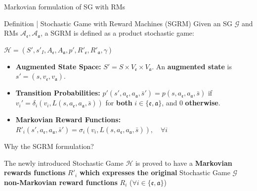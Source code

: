 \documentclass[10pt, aspectratio=169]{beamer}
\newcommand{\evidenzia}[1]{\textcolor{verdeSalvia}{\textbf{#1}}}
\begin{document}
\begin{frame}{Markovian formulation of SG with RMs}

    \begin{block}{Definition | Stochastic Game with Reward Machines (SGRM)}
        \vspace{0.2cm}Given an SG $\mathcal{G}$ and RMs $\mathcal{A}_{\mathfrak{e}}, \mathcal{A}_{\mathfrak{a}}$, a SGRM is defined as a product stochastic game:

        \begin{center}
            $\mathcal{H} = (S', s'_I, A_{\mathfrak{e}}, A_{\mathfrak{a}}, p', R'_{\mathfrak{e}}, R'_{\mathfrak{a}}, \gamma)$
        \end{center}

        \begin{itemize}
            \item \textbf{Augmented State Space:} $S' = S \times V_{\mathfrak{e}} \times V_{\mathfrak{a}}$. An \evidenzia{augmented state} is $s' = (s, v_{\mathfrak{e}}, v_{\mathfrak{a}})$.
            \item \textbf{Transition Probabilities:} $p'(s', a_{\mathfrak{e}}, a_{\mathfrak{a}}, \bar{s}') = p(s, a_{\mathfrak{e}}, a_{\mathfrak{a}}, \bar{s})$ if $v_i' = \delta_i(v_i, L(s, a_{\mathfrak{e}}, a_{\mathfrak{a}}, \bar{s}))$ for \evidenzia{both} $i \in \{\mathfrak{e}, \mathfrak{a}\}$, and $0$ \evidenzia{otherwise}.
            \item \textbf{Markovian Reward Functions:} $R'_i(s', a_{\mathfrak{e}}, a_{\mathfrak{a}}, \bar{s}') = \sigma_i(v_i, L(s, a_{\mathfrak{e}}, a_{\mathfrak{a}}, \bar{s})),\quad \forall i$
        \end{itemize}
    \end{block}
    \vspace{0.2cm}

\end{frame}


\begin{frame}{Why the SGRM formulation?}

    The newly introduced Stochastic Game $\mathcal{H}$ is proved to have a \evidenzia{Markovian rewards functions} $R'_i$ \evidenzia{which expresses the original} Stochastic Game $\mathcal{G}$ \evidenzia{non-Markovian reward functions} $R_i$ ($\forall i\in\{\mathfrak{e},\mathfrak{a}\}$)

\end{frame}
\end{document}
